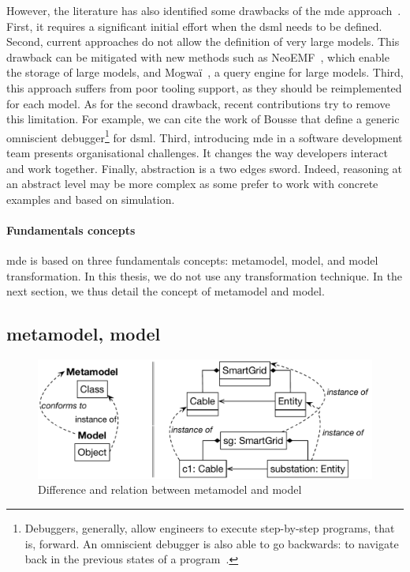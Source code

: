 However, the literature has also identified some drawbacks of the \gls{mde} approach~\cite{DBLP:conf/ifm/Kent02, DBLP:conf/uml/BakerLW05, DBLP:conf/models/WhittleHRBH13, DBLP:conf/icse/HutchinsonRW11}.
First, it requires a significant initial effort when the \gls{dsml} needs to be defined.
Second, current approaches do not allow the definition of very large \glspl{model}.
This drawback can be mitigated with new methods such as NeoEMF~\cite{DBLP:conf/ecmdafa/BenelallamGSTL14, DBLP:journals/scp/DanielSBTVGC17}, which enable the storage of large \glspl{model},  and Mogwaï~\cite{DBLP:conf/rcis/DanielSC16}, a query engine for large \glspl{model}.
Third, this approach suffers from poor tooling support, as they should be reimplemented for each \gls{model}.
As for the second drawback, recent contributions try to remove this limitation.
For example, we can cite the work of Bousse \etal \cite{DBLP:journals/jss/BousseLCWB18} that define a generic omniscient debugger\footnote{Debuggers, generally, allow engineers to execute step-by-step programs, that is, forward. An omniscient debugger is also able to go backwards: to navigate back in the previous states of a program~\cite{DBLP:journals/corr/cs-SE-0310016}.} for \gls{dsml}.
Third, introducing \gls{mde} in a software development team presents organisational challenges.
It changes the way developers interact and work together.
Finally, abstraction is a two edges sword.
Indeed, reasoning at an abstract level may be more complex as some prefer to work with concrete examples and based on simulation.

\paragraph{Fundamentals concepts}
\gls{mde} is based on three fundamentals concepts: \gls{metamodel}, \gls{model}, and model transformation.
In this thesis, we do not use any transformation technique.
In the next section, we thus detail the concept of \gls{metamodel} and \gls{model}.

\subsection[Metamodel, model]{\Gls{metamodel}, \gls{model}}

\begin{figure}
	\centering
	\includegraphics[width=0.8\linewidth]{img/chapt-background/mde/metavsmodel}
	\caption{Difference and relation between \gls{metamodel} and \gls{model}}
	\label{fig:background:mde:meta-model}
\end{figure}

